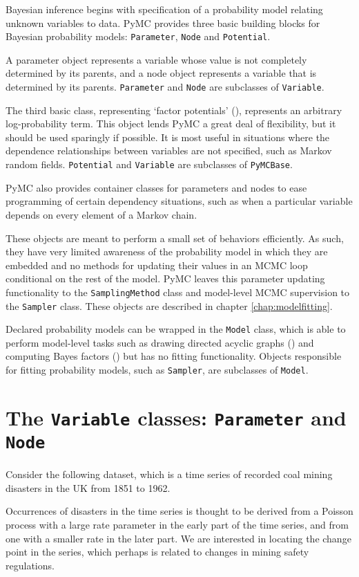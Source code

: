 
Bayesian inference begins with specification of a probability model relating unknown variables to data. PyMC provides three basic building blocks for Bayesian probability models: \texttt{Parameter}, \texttt{Node} and \texttt{Potential}. 

A parameter object represents a variable whose value is not completely determined by its parents, and a node object represents a variable that is determined by its parents. \texttt{Parameter} and \texttt{Node} are subclasses of \texttt{Variable}.

The third basic class, representing `factor potentials' (\cite{dawidmarkov,jordangraphical}), represents an arbitrary log-probability term. This object lends PyMC a great deal of flexibility, but it should be used sparingly if possible. It is most useful in situations where the dependence relationships between variables are not specified, such as Markov random fields. \texttt{Potential} and \texttt{Variable} are subclasses of \texttt{PyMCBase}.

PyMC also provides container classes for parameters and nodes to ease programming of certain dependency situations, such as when a particular variable depends on every element of a Markov chain.

These objects are meant to perform a small set of behaviors efficiently. As such, they have very limited awareness of the probability model in which they are embedded and no methods for updating their values in an MCMC loop conditional on the rest of the model. PyMC leaves this parameter updating functionality to the \texttt{SamplingMethod} class and model-level MCMC supervision to the \texttt{Sampler} class. These objects are described in chapter \ref{chap:modelfitting}. 

Declared probability models can be wrapped in the \texttt{Model} class, which is able to perform model-level tasks such as drawing directed acyclic graphs (\cite{dawidmarkov,jordangraphical}) and computing Bayes factors (\cite{gelman}) but has no fitting functionality. Objects responsible for fitting probability models, such as \texttt{Sampler}, are subclasses of \texttt{Model}.

\section{The \texttt{Variable} classes: \texttt{Parameter} and \texttt{Node}}
Consider the following dataset, which is a time series of recorded coal mining disasters in the UK from 1851 to 1962.
\begin{center}
\end{center}
Occurrences of disasters in the time series is thought to be derived from a Poisson process with a large rate parameter in the early part of the time series, and from one with a smaller rate in the later part. We are interested in locating the change point in the series, which perhaps is related to changes in mining safety regulations.

